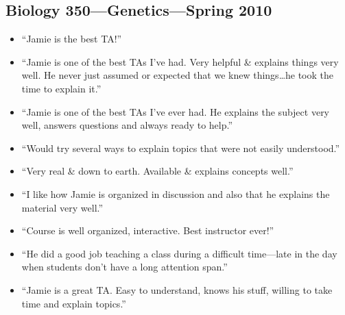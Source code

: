 \documentclass[10pt]{article}
\newenvironment{myItemize}{
  \begin{itemize}
    \setlength{\leftskip}{-4mm}
    \setlength{\itemsep}{0.25em}
    \setlength{\parskip}{0pt}
    \setlength{\parsep}{0.5em}}
  {\end{itemize}}
\begin{document}
\subsection*{Biology 350---Genetics---Spring 2010}
\begin{myItemize}
\sffamily
\item ``Jamie is the best TA!''
\item ``Jamie is one of the best TAs I've had. Very
helpful \& explains things very well. He never just assumed or
expected that we knew things\ldots he took the time to explain it.''
\item ``Jamie is one of the best TAs I've ever had. He explains the subject
very well, answers questions and always ready to help.''
\item ``Would try several ways to explain topics that were not easily
understood.''
\item ``Very real \& down to earth. Available \& explains concepts well.''
\item ``I like how Jamie is organized in discussion and also that he explains the material very well.''
\item ``Course is well organized, interactive. Best instructor ever!''
\item ``He did a good job teaching a class during a difficult time---late in the day when students don't have a long attention span.''
\item ``Jamie is a great TA. Easy to understand, knows his stuff, willing to
take time and explain topics.''
\end{myItemize}
\end{document}
